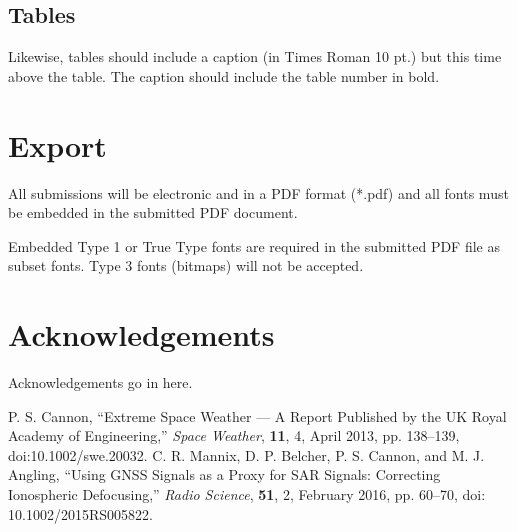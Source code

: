\documentclass[spc]{ursi}
\begin{document}
\subsection{Tables}

Likewise, tables should include a caption (in Times Roman 10 pt.) but this
time above the table. The caption should include the table number in bold.

\section{Export}
All submissions will be electronic and in a PDF format (*.pdf) and all
fonts must be embedded in the submitted PDF document.

Embedded Type 1 or True Type fonts are required in the submitted PDF file
as subset fonts. Type 3 fonts (bitmaps) will not be accepted. 

\section*{Acknowledgements}

Acknowledgements go in here.

\begin{thebibliography}{99}
 P. S. Cannon, ``Extreme Space Weather --- A Report
  Published by the UK Royal Academy of Engineering,'' \emph{Space Weather},
  \textbf{11}, 4, April 2013, pp. 138--139, doi:10.1002/swe.20032.
 C. R. Mannix, D. P. Belcher, P. S. Cannon, and
  M. J. Angling, ``Using GNSS Signals as a Proxy for SAR Signals:
  Correcting Ionospheric Defocusing,'' \emph{Radio Science}, \textbf{51},
  2, February 2016, pp. 60--70, doi: 10.1002/2015RS005822.
\end{thebibliography}
\end{document}
